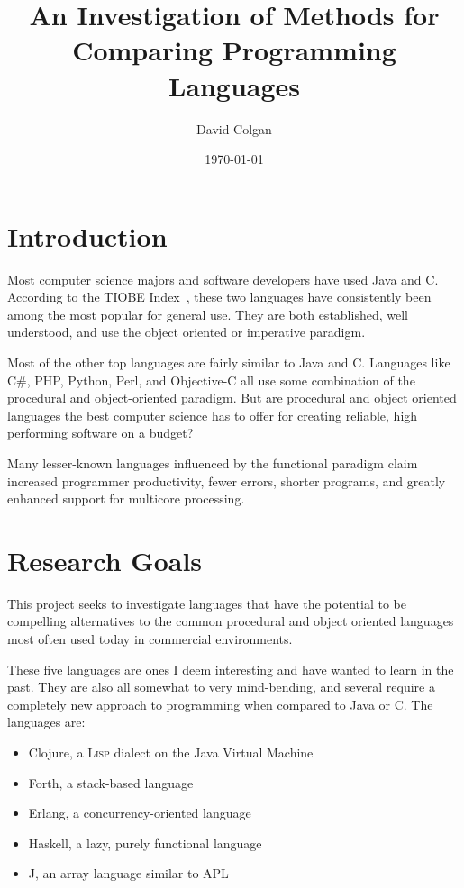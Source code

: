 \documentclass{article}
\title{An Investigation of Methods for Comparing Programming Languages}
\author{David Colgan}
\date{\today}
\begin{document}
\maketitle

\section{Introduction}

Most computer science majors and software developers have used Java and C.
According to the TIOBE Index~\cite{tiobe}, these two languages have
consistently been among the most popular for general use.  They are both
established, well understood, and use the object oriented or imperative
paradigm.

Most of the other top languages are fairly similar to Java and C.  Languages
like C\#, PHP, Python, Perl, and Objective-C all use some combination of the
procedural and object-oriented paradigm.   But are procedural and object
oriented languages the best computer science has to offer for creating
reliable, high performing software on a budget?

Many lesser-known languages influenced by the functional paradigm claim
increased programmer productivity, fewer errors, shorter programs, and greatly
enhanced support for multicore processing.

\section{Research Goals}

This project seeks to investigate languages that have the potential to be
compelling alternatives to the common procedural and object oriented languages
most often used today in commercial environments.

These five languages are ones I deem interesting and have wanted to learn in
the past.  They are also all somewhat to very mind-bending, and several require
a completely new approach to programming when compared to Java or C.  The
languages are:

\begin{itemize}
\item Clojure, a \textsc{Lisp} dialect on the Java Virtual Machine

\item Forth, a stack-based language

\item Erlang, a concurrency-oriented language

\item Haskell, a lazy, purely functional language

\item J, an array language similar to APL
\end{itemize}
\end{document}
